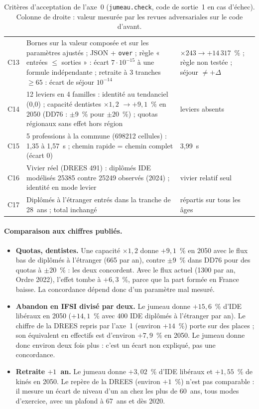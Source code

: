 \documentclass[11pt]{article}
\begin{document}
\begin{table}[h]
\begin{tabular}{lp{6.3cm}p{5.0cm}}
C13 & Bornes sur la valeur composée et sur les paramètres ajustés ; JSON + \texttt{over} ;
règle « entrées $\le$ sorties » : écart $7\cdot10^{-15}$\mesure{} à une formule indépendante ;
retraite à 3 tranches $\ge 65$ : écart de séjour $10^{-14}$\mesure{} & $\times243 \to +14\,317$~\% ;
règle non testée ; séjour $\ne +\Delta$ \\
C14 & 12 leviers en 4 familles : identité au tendanciel (0,0) ; capacité dentistes $\times1{,}2$
$\to +9{,}1$\mesure{}~\% en 2050 (DD76 : $\pm9$~\% pour $\pm20$~\%) ; quotas régionaux sans effet hors
région & leviers absents \\
C15 & 5 professions à la commune (\num{698212} cellules) : 1,35 à 1,57\mesure{}~s ; chemin rapide
= chemin complet (écart 0) & 3,99\mesure{}~s \\
C16 & Vivier réel (DREES 491) : diplômés IDE modélisés \num{25385} contre \num{25249} observés
(2024) ; identité en mode levier & vivier relatif seul \\
C17 & Diplômés à l'étranger entrés dans la tranche de 28~ans ; total inchangé & répartis sur tous
les âges \\
\bottomrule
\end{tabular}
\caption{Critères d'acceptation de l'axe~0 (\texttt{jumeau.check}, code de sortie~1 en cas
d'échec). Colonne de droite : valeur mesurée par les revues adversariales sur le code d'avant.}
\label{tab:criteres}
\end{table}

\paragraph{Comparaison aux chiffres publiés.}
\begin{itemize}
  \item \textbf{Quotas, dentistes.} Une capacité $\times1{,}2$ donne $+9{,}1$\mesure{}~\% en 2050 avec le
        flux bas de diplômés à l'étranger (665 par an), contre $\pm9$~\% dans DD76 pour des quotas à
        $\pm20$~\% \citep{drees2021dd76} : les deux concordent. Avec le flux actuel (\num{1300} par an,
        Ordre 2022), l'effet tombe à $+6{,}3$\mesure{}~\%, parce que la part formée en France baisse.
        La concordance dépend donc d'un paramètre mal mesuré.
  \item \textbf{Abandon en IFSI divisé par deux.} Le jumeau donne $+15{,}6$\mesure{}~\% d'IDE libéraux
        en 2050 ($+14{,}1$\mesure{}~\% avec 400 IDE diplômés à l'étranger par an). Le chiffre de la DREES repris par l'axe~1 (environ $+14$~\%) porte sur des places ;
        son équivalent en effectifs est d'environ $+7{,}9$~\% en 2050. Le jumeau donne donc environ deux
        fois plus : c'est un écart non expliqué, pas une concordance.
  \item \textbf{Retraite $+1$~an.} Le jumeau donne $+3{,}02$\mesure{}~\% d'IDE libéraux et
        $+1{,}55$\mesure{}~\% de kinés en 2050. Le repère de la DREES (environ $+1$~\%) n'est pas
        comparable : il mesure un écart de niveau d'un an chez les plus de 60~ans, tous modes
        d'exercice, avec un plafond à 67~ans et dès 2020.
\end{itemize}
\end{document}
